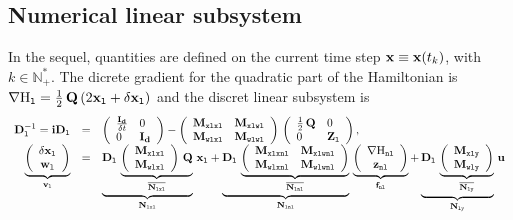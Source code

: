 \documentclass[10pt,a4paper]{article}
\begin{document}
\subsection{Numerical linear subsystem}
In the sequel, quantities are defined on the current time step ${\mathbf{x}}\equiv{\mathbf{x}}(t_k)$, with $k\in\mathbb{N}_{+}^{*}$.
%
The dicrete gradient for the quadratic part of the Hamiltonian is ${\small \nabla{\mathrm{H}}_{\mathtt{l}} =\frac{1}{2}\,\mathbf{Q}\, (2{\mathbf{x}}_{\mathtt{l}} + \delta {\mathbf{x}}_{\mathtt{l}})}$ and the discret linear subsystem is
%
\begin{equation}
\begin{array}{rcl}
\mathbf{D}_{\mathtt{l}}^{-1} = \mathbf{iD}_{\mathtt{l}} &=& \left(\begin{array}{ll}
\frac{\mathbf{I_d}}{\delta t}&0 \\ 
0 &\mathbf{I_d}
\end{array}\right)-\left(\begin{array}{ll}
\mathbf{M}_{\mathtt{xlxl}}&\mathbf{M}_{\mathtt{xlwl}} \\ 
\mathbf{M}_{\mathtt{wlxl}}&\mathbf{M}_{\mathtt{wlwl}} 
\end{array}\right)\,\left(\begin{array}{ll}
\frac{1}{2}\,\mathbf{Q}&0 \\ 
0 &\mathbf{Z}_{\mathtt{l}}
\end{array}\right),\\
\underbrace{\left(\begin{array}{c}
\delta {\mathbf{x}}_{\mathtt{l}}\\
{\mathbf{w}}_{\mathtt{l}}
\end{array}\right) 
}_{\mathbf{v}_{\mathtt{l}}}
& = &
\underbrace{\mathbf{D}_{\mathtt{l}}\,
\underbrace{\left(\begin{array}{ll}
\mathbf{M}_{\mathtt{xlxl}}\\ 
\mathbf{M}_{\mathtt{wlxl}}
\end{array}\right)\,\mathbf{Q}}_{\overline{\mathbf{N}_{\mathtt{lxl}}}}}_{\mathbf{N}_{\mathtt{lxl}}}
\, 
{\mathbf{x}}_{\mathtt{l}}
+
  \underbrace{\mathbf{D}_{\mathtt{l}}\,
\underbrace{\left(\begin{array}{ll}
\mathbf{M}_{\mathtt{xlxnl}}& \mathbf{M}_{\mathtt{xlwnl}} \\ 
 \mathbf{M}_{\mathtt{wlxnl}}& \mathbf{M}_{\mathtt{wlwnl}} 
\end{array}\right)}_{\overline{\mathbf{N}_{\mathtt{lnl}}}}}_{\mathbf{N}_{\mathtt{lnl}}}
\,
\underbrace{\left(\begin{array}{c}
\nabla{\mathrm{H}}_{\mathtt{nl}}\\
{\mathbf{z}}_{\mathtt{nl}}
\end{array}\right) 
}_{\mathbf{f}_{\mathtt{nl}}}
+
  \underbrace{\mathbf{D}_{\mathtt{l}}\,
\underbrace{\left(\begin{array}{l}
 \mathbf{M}_{\mathtt{xly}}\\ 
 \mathbf{M}_{\mathtt{wly}}
\end{array}\right)}_{\overline{\mathbf{N}_{\mathtt{ly}}}}}_{\mathbf{N}_{\mathtt{ly}}}
\,
{\mathbf{u}}
\end{array}
\end{equation}
%
\end{document}
